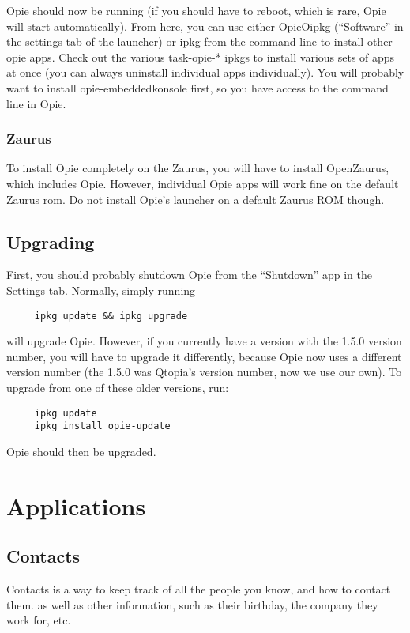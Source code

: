 \documentclass[12pt,letterpaper,oneside, openany]{book} \usepackage[latin1] {inputenc}
\begin{document}
Opie should now be running (if you should have to reboot, which is rare, Opie will start automatically). From here, you can use either OpieOipkg (``Software'' in the settings tab of the launcher) or ipkg from the command line to install other opie apps. Check out the various task-opie-* ipkgs to install various sets of apps at once (you can always uninstall individual apps individually). You will probably want to install opie-embeddedkonsole first, so you have access to the command line in Opie. 

\section{Zaurus}

To install Opie completely on the Zaurus, you will have to install OpenZaurus, which includes Opie. However, individual Opie apps will work fine on the default Zaurus rom. Do not install Opie's launcher on a default Zaurus ROM though. 


\chapter{Upgrading} 

First, you should probably shutdown Opie from the ``Shutdown'' app in the Settings tab. Normally, simply running 
\begin{verbatim}
     ipkg update && ipkg upgrade
\end{verbatim}
will upgrade Opie. However, if you currently have a version with the 1.5.0 version number, you will have to upgrade it differently, because Opie now uses a different version number (the 1.5.0 was Qtopia's version number, now we use our own). To upgrade from one of these older versions, run: 
\begin{verbatim}
     ipkg update
     ipkg install opie-update
\end{verbatim}
Opie should then be upgraded.

\part{Applications}
\chapter{Contacts}
Contacts is a way to keep track of all the people you know, and how to contact them.  as well as other information, such as their birthday, the company they work for, etc.
\end{document}
